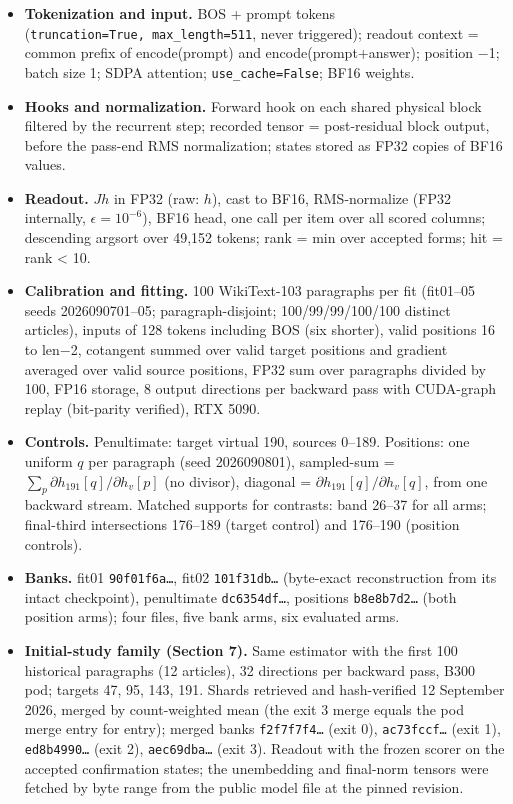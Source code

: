 \begin{itemize}
\tightlist
\item
  \textbf{Tokenization and input.} BOS + prompt tokens
  (\texttt{truncation=True,\ max\_length=511}, never triggered); readout
  context = common prefix of encode(prompt) and encode(prompt+answer);
  position −1; batch size 1; SDPA attention; \texttt{use\_cache=False};
  BF16 weights.
\item
  \textbf{Hooks and normalization.} Forward hook on each shared physical
  block filtered by the recurrent step; recorded tensor = post-residual
  block output, before the pass-end RMS normalization; states stored as
  FP32 copies of BF16 values.
\item
  \textbf{Readout.} \(J h\) in FP32 (raw: \(h\)), cast to BF16,
  RMS-normalize (FP32 internally, \(\epsilon=10^{-6}\)), BF16 head, one
  call per item over all scored columns; descending argsort over 49,152
  tokens; rank = min over accepted forms; hit = rank \textless{} 10.
\item
  \textbf{Calibration and fitting.} 100 WikiText-103 paragraphs per fit
  (fit01--05 seeds 2026090701--05; paragraph-disjoint; 100/99/99/100/100
  distinct articles), inputs of 128 tokens including BOS (six shorter),
  valid positions 16 to len−2, cotangent summed over valid target
  positions and gradient averaged over valid source positions, FP32 sum
  over paragraphs divided by 100, FP16 storage, 8 output directions per
  backward pass with CUDA-graph replay (bit-parity verified), RTX 5090.
\item
  \textbf{Controls.} Penultimate: target virtual 190, sources 0--189.
  Positions: one uniform \(q\) per paragraph (seed 2026090801),
  sampled-sum = \(\sum_p \partial h_{191}[q]/\partial h_v[p]\) (no
  divisor), diagonal = \(\partial h_{191}[q]/\partial h_v[q]\), from one
  backward stream. Matched supports for contrasts: band 26--37 for all
  arms; final-third intersections 176--189 (target control) and 176--190
  (position controls).
\item
  \textbf{Banks.} fit01 \texttt{90f01f6a…}, fit02 \texttt{101f31db…}
  (byte-exact reconstruction from its intact checkpoint), penultimate
  \texttt{dc6354df…}, positions \texttt{b8e8b7d2…} (both position arms);
  four files, five bank arms, six evaluated arms.
\item
  \textbf{Initial-study family (Section 7).} Same estimator with the
  first 100 historical paragraphs (12 articles), 32 directions per
  backward pass, B300 pod; targets 47, 95, 143, 191. Shards retrieved
  and hash-verified 12 September 2026, merged by count-weighted mean
  (the exit 3 merge equals the pod merge entry for entry); merged banks
  \texttt{f2f7f7f4…} (exit 0), \texttt{ac73fccf…} (exit 1),
  \texttt{ed8b4990…} (exit 2), \texttt{aec69dba…} (exit 3). Readout with
  the frozen scorer on the accepted confirmation states; the unembedding
  and final-norm tensors were fetched by byte range from the public
  model file at the pinned revision.
\end{itemize}
